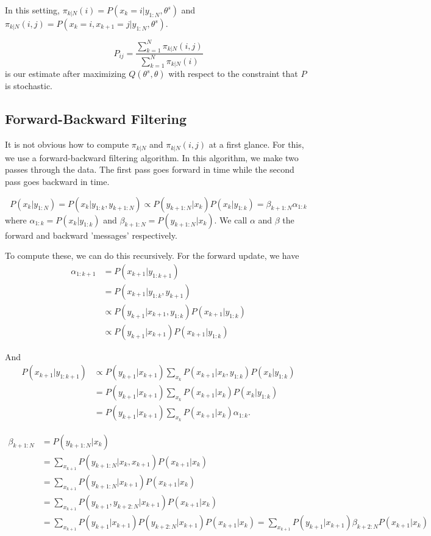 \documentclass[english]{article}
\numberwithin{equation}{section}
\begin{document}
	In this setting, $\pi_{k|N}(i)=P(x_k=i|y_{1:N},\theta^s)$ and $\pi_{k|N}(i,j)=P(x_k=i,x_{k+1}=j|y_{1:N},\theta^s)$.
	
	$$P_{ij}=\frac{\sum_{k=1}^N \pi_{k|N}(i,j)}{\sum_{k=1}^N \pi_{k|N}(i)}$$ is our estimate after maximizing $Q(\theta^{s},\theta)$ with respect to the constraint that $P$ is stochastic.
	
	\subsection*{Forward-Backward Filtering}
	
	It is not obvious how to compute $\pi_{k|N}$ and $\pi_{k|N}(i,j)$ at a first glance. For this, we use a forward-backward filtering algorithm. In this algorithm, we make two passes through the data. The first pass goes forward in time while the second pass goes backward in time.
	
	$$P(x_k|y_{1:N})=P(x_k|y_{1:k},y_{k+1:N})\propto P(y_{k+1:N}|x_k)P(x_k|y_{1:k})=\beta_{k+1:N}\alpha_{1:k}$$ where $\alpha_{1:k} = P(x_k|y_{1:k})$ and $\beta_{k+1:N}=P(y_{k+1:N}|x_k)$. We call $\alpha$ and $\beta$ the forward and backward 'messages' respectively.
	
	To compute these, we can do this recursively. For the forward update, we have
	\begin{align*}
	\alpha_{1:k+1} &=P(x_{k+1}|y_{1:k+1}) \\
	&=P(x_{k+1}|y_{1:k},y_{k+1}) \\
	&\propto P(y_{k+1}|x_{k+1},y_{1:k})P(x_{k+1}|y_{1:k}) \\
	&\propto P(y_{k+1}|x_{k+1}) P(x_{k+1}|y_{1:k}) 
	\end{align*}
	
	And \begin{align*}
	P(x_{k+1}|y_{1:k+1}) &\propto P(y_{k+1}|x_{k+1})\sum_{x_k} P(x_{k+1}|x_k,y_{1:k})P(x_k|y_{1:k}) \\
	&= P(y_{k+1}|x_{k+1})\sum_{x_k} P(x_{k+1}|x_k)P(x_k|y_{1:k}) \\
	&= P(y_{k+1}|x_{k+1})\sum_{x_k} P(x_{k+1}|x_k)\alpha_{1:k}.
	\end{align*}
	
	\begin{align*}
	\beta_{k+1:N} &=P(y_{k+1:N}|x_k) \\
	&=\sum_{x_{k+1}}P(y_{k+1:N}|x_k,x_{k+1})P(x_{k+1}|x_k) \\
	&= \sum_{x_{k+1}}P(y_{k+1:N}|x_{k+1})P(x_{k+1}|x_k) \\
	&= \sum_{x_{k+1}}P(y_{k+1},y_{k+2:N}|x_{k+1})P(x_{k+1}|x_k) \\
	&= \sum_{x_{k+1}}P(y_{k+1}|x_{k+1})P(y_{k+2:N}|x_{k+1})P(x_{k+1}|x_k) = \sum_{x_{k+1}} P(y_{k+1}|x_{k+1})\beta_{k+2:N}P(x_{k+1}|x_k)
	\end{align*}
	
\end{document}
